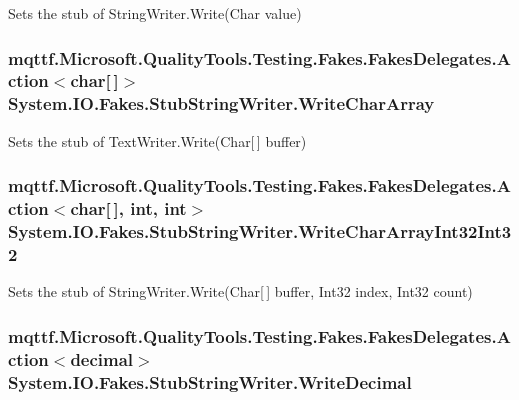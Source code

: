 Sets the stub of String\-Writer.\-Write(\-Char value)

\hypertarget{class_system_1_1_i_o_1_1_fakes_1_1_stub_string_writer_abdcafadde4a145373695a8e22b3c313a}{
\subsubsection[{Write\-Char\-Array}]{\setlength{\rightskip}{0pt plus 5cm}mqttf.\-Microsoft.\-Quality\-Tools.\-Testing.\-Fakes.\-Fakes\-Delegates.\-Action$<$char\mbox{[}$\,$\mbox{]}$>$ System.\-I\-O.\-Fakes.\-Stub\-String\-Writer.\-Write\-Char\-Array}}\label{class_system_1_1_i_o_1_1_fakes_1_1_stub_string_writer_abdcafadde4a145373695a8e22b3c313a}


Sets the stub of Text\-Writer.\-Write(\-Char\mbox{[}$\,$\mbox{]} buffer)

\hypertarget{class_system_1_1_i_o_1_1_fakes_1_1_stub_string_writer_a859baea6334c4b7eb0cb2041af7749e7}{
\subsubsection[{Write\-Char\-Array\-Int32\-Int32}]{\setlength{\rightskip}{0pt plus 5cm}mqttf.\-Microsoft.\-Quality\-Tools.\-Testing.\-Fakes.\-Fakes\-Delegates.\-Action$<$char\mbox{[}$\,$\mbox{]}, int, int$>$ System.\-I\-O.\-Fakes.\-Stub\-String\-Writer.\-Write\-Char\-Array\-Int32\-Int32}}\label{class_system_1_1_i_o_1_1_fakes_1_1_stub_string_writer_a859baea6334c4b7eb0cb2041af7749e7}


Sets the stub of String\-Writer.\-Write(\-Char\mbox{[}$\,$\mbox{]} buffer, Int32 index, Int32 count)

\hypertarget{class_system_1_1_i_o_1_1_fakes_1_1_stub_string_writer_a9d3cf0b980bcfd8f2923f59527c0ce15}{
\subsubsection[{Write\-Decimal}]{\setlength{\rightskip}{0pt plus 5cm}mqttf.\-Microsoft.\-Quality\-Tools.\-Testing.\-Fakes.\-Fakes\-Delegates.\-Action$<$decimal$>$ System.\-I\-O.\-Fakes.\-Stub\-String\-Writer.\-Write\-Decimal}}\label{class_system_1_1_i_o_1_1_fakes_1_1_stub_string_writer_a9d3cf0b980bcfd8f2923f59527c0ce15}


